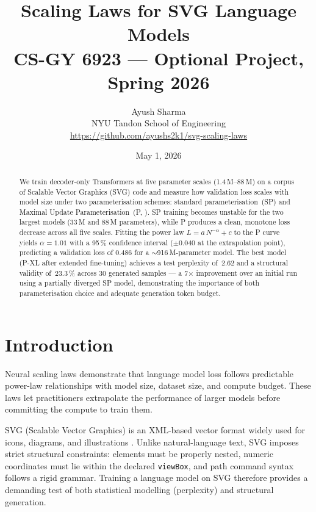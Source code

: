 \documentclass[11pt,a4paper]{article}
\title{\textbf{Scaling Laws for SVG Language Models}\\[4pt]
  \large CS-GY 6923 --- Optional Project, Spring 2026}
\author{Ayush Sharma\\NYU Tandon School of Engineering\\[4pt]
  \small\url{https://github.com/ayushs2k1/svg-scaling-laws}}
\date{May 1, 2026}
\begin{document}
\maketitle

\begin{abstract}
We train decoder-only Transformers at five parameter scales (1.4\,M--88\,M) on a corpus
of Scalable Vector Graphics (SVG) code and measure how validation loss scales with model
size under two parameterisation schemes: standard parameterisation~(SP) and Maximal Update
Parameterisation~(\textmu P, \citealt{yang2022mup}).  SP training becomes unstable for
the two largest models (33\,M and 88\,M parameters), while \textmu P produces a clean,
monotone loss decrease across all five scales.  Fitting the power law $L = a\,N^{-\alpha}
+ c$ to the \textmu P curve yields $\alpha = 1.01$ with a 95\,\% confidence
interval ($\pm 0.040$ at the extrapolation point), predicting a validation loss of $0.486$
for a $\sim$916\,M-parameter model.  The best model (\textmu P-XL after extended
fine-tuning) achieves a test perplexity of~2.62 and a structural validity of~23.3\,\%
across 30 generated samples --- a 7$\times$ improvement over an initial run using a
partially diverged SP model, demonstrating the importance of both parameterisation
choice and adequate generation token budget.
\end{abstract}

\section{Introduction}

Neural scaling laws \citep{kaplan2020scaling, hoffmann2022chinchilla} demonstrate that
language model loss follows predictable power-law relationships with model size, dataset
size, and compute budget.  These laws let practitioners extrapolate the performance of
larger models before committing the compute to train them.

SVG (Scalable Vector Graphics) is an XML-based vector format widely used for icons,
diagrams, and illustrations \citep{rodriguez2023starvector}.  Unlike natural-language
text, SVG imposes strict structural constraints: elements must be properly nested,
numeric coordinates must lie within the declared \texttt{viewBox}, and path command
syntax follows a rigid grammar.  Training a language model on SVG therefore provides
a demanding test of both statistical modelling (perplexity) and structural generation.
\end{document}
